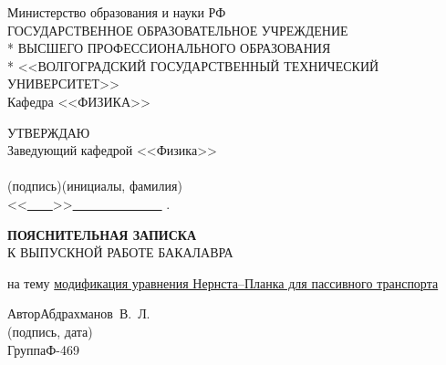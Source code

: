 \begin{titlepage}
	\begin{center}
		Министерство образования и науки РФ \\
		\vspace{.5cm}
		ГОСУДАРСТВЕННОЕ ОБРАЗОВАТЕЛЬНОЕ УЧРЕЖДЕНИЕ\\*
		ВЫСШЕГО ПРОФЕССИОНАЛЬНОГО ОБРАЗОВАНИЯ\\*
		<<ВОЛГОГРАДСКИЙ ГОСУДАРСТВЕННЫЙ ТЕХНИЧЕСКИЙ УНИВЕРСИТЕТ>>\\
		\vspace{.5cm}
		Кафедра <<ФИЗИКА>>
		\vspace{.5cm}
	\end{center}
	\begin{flushright}
		УТВЕРЖДАЮ\\
		Заведующий кафедрой <<Физика>>\\
		\vspace{.3cm}
		\underline{\hspace{2cm}}\hspace{1cm}\underline{\hspace{4cm}}\\
		\vspace{-.2cm}\footnotesize(подпись)\hspace{1.8cm}(инициалы, фамилия)
			\hspace*{.2cm}\ \normalsize\\
		\vspace{.3cm}
		<<\underline{\ \ \ \ }>>\underline{\ \ \ \ \ \ \ \ \ \ \ \ \ \ } 
			\the{}.
	\end{flushright}
	\begin{center}
		\LARGE \textbf{ПОЯСНИТЕЛЬНАЯ ЗАПИСКА} \\
		\large К ВЫПУСКНОЙ РАБОТЕ БАКАЛАВРА
	\end{center}
	\begin{center}
		на тему \underline{модификация уравнения Нернста--Планка для пассивного транспорта}
	\end{center}
	\begin{flushleft}
		Автор\hspace{2.5cm}Абдрахманов~В.~Л.\hfill\underline{\hspace{5cm}}\\
		\vspace{-.2cm}\hspace{14cm}\footnotesize(подпись, дата)\normalsize\\
		\vspace{-.5cm}
		Группа\hspace{2.2cm}Ф-469\\

\end{flushleft}
\end{titlepage}
